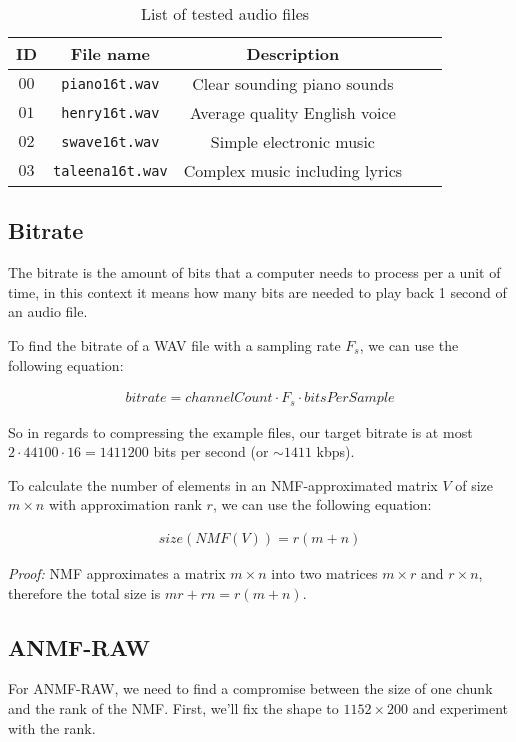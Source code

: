 \begin{table}[htbp]\caption{List of tested audio files}
	\label{tab:audio_examples}
	\centering
	\begin{tabular}{|c|c|c|c|l|}
		\hline
		ID & File name & Description \\ \hline
		$00$ & \verb|piano16t.wav| & Clear sounding piano sounds \\
		$01$ & \verb|henry16t.wav| & Average quality English voice \\
		$02$ & \verb|swave16t.wav| & Simple electronic music \\
		$03$ & \verb|taleena16t.wav| & Complex music including lyrics \\
		\hline
	\end{tabular}
\end{table}

\subsection{Bitrate}
The bitrate is the amount of bits that a computer needs to process per a unit of time, in this context it means how many bits are needed to play back 1 second of an audio file.

To find the bitrate of a WAV file with a sampling rate $F_s$, we can use the following equation:

\begin{align}
bitrate = channelCount \cdot F_s \cdot bitsPerSample
\end{align}

So in regards to compressing the example files, our target bitrate is at most $2 \cdot 44100 \cdot 16 = 1411200$ bits per second (or $\sim 1411$ kbps).

To calculate the number of elements in an NMF-approximated matrix $V$ of size $m \times n$ with approximation rank $r$, we can use the following equation:

\begin{align}
\label{equ:nmf_size}
size(NMF(V)) = r(m+n)
\end{align}

\emph{Proof:} NMF approximates a matrix $m \times n$ into two matrices $m \times r$ and $r \times n$, therefore the total size is $mr + rn = r(m+n)$.

\subsection{ANMF-RAW}
For ANMF-RAW, we need to find a compromise between the size of one chunk and the rank of the NMF. First, we'll fix the shape to $1152 \times 200$ and experiment with the rank.

